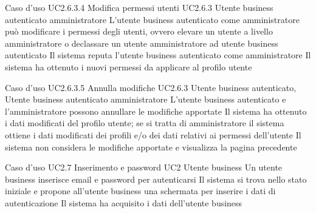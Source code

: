 \UCtitle
{Caso d'uso UC2.6.3.4}
{Modifica permessi utenti}
\UC
{UC2.6.3}
{Utente business autenticato amministratore}
{L'utente business autenticato come amministratore può modificare i permessi degli utenti, ovvero elevare un utente a livello amministratore o declassare un utente amministratore ad utente business autenticato}
{Il sistema reputa l'utente business autenticato come amministratore}
\post
{Il sistema ha ottenuto i nuovi permessi da applicare al profilo utente}


\UCtitle
{Caso d'uso UC2.6.3.5}
{Annulla modifiche}
\UC
{UC2.6.3}
{Utente business autenticato, Utente business autenticato amministratore}
{L'utente business autenticato e l'amministratore possono annullare le modifiche apportate}
{Il sistema ha ottenuto i dati modificati del profilo utente; se si tratta di amministratore il sistema ottiene i dati modificati dei profili e/o dei dati relativi ai permessi dell'utente}
\post
{Il sistema non considera le modifiche apportate e visualizza la pagina precedente}



\UCtitle
{Caso d'uso UC2.7}
{Inserimento  e password}
\UC
{UC2}
{Utente business}
{Un utente business inserisce email e password per autenticarsi}
{Il sistema si trova nello stato iniziale e propone all'utente business una schermata per inserire i dati di autenticazione}
\post
{Il sistema ha acquisito i dati dell'utente business}







